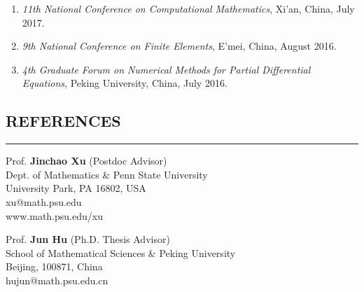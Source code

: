\documentclass[10pt,a4]{article}
\begin{document}
\begin{small}
\begin{enumerate}
    \item  
       {\it 11th National Conference on Computational Mathematics}, Xi'an, China, July 2017. 

    \item 
       {\it 9th National Conference on Finite Elements}, E'mei, China, August 2016. 

    \item  
       {\it 4th Graduate Forum on Numerical Methods for Partial Differential Equations}, Peking University, China, July 2016. 
   
\end{enumerate}
 
 


\vspace{0.1cm}

\subsection*{REFERENCES}
\hrule
\vspace{0.2cm}
 
\begin{footnotesize}

\begin{multicols}{2} 
\noindent 
Prof. \textbf{Jinchao Xu} (Postdoc Advisor) \\ 
Dept. of Mathematics \& Penn State University\\
University Park, PA 16802, USA\\
xu@math.psu.edu \\
www.math.psu.edu/xu\\

\columnbreak

\noindent
Prof. \textbf{Jun Hu} (Ph.D. Thesis Advisor)\\ 
School of Mathematical Sciences \& Peking University \\
Beijing, 100871, China \\  
hujun@math.psu.edu.cn \\


\end{multicols}

\end{footnotesize}
\end{small}
\end{document}

